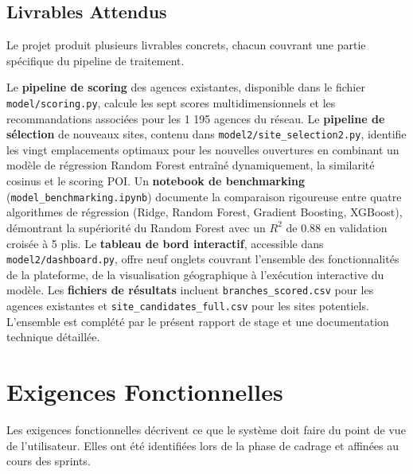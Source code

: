 \documentclass[11pt,a4paper,twoside]{report}
\begin{document}
\subsection{Livrables Attendus}

Le projet produit plusieurs livrables concrets, chacun couvrant une partie spécifique du pipeline de traitement.

Le \textbf{pipeline de scoring} des agences existantes, disponible dans le fichier \texttt{model/scoring.py}, calcule les sept scores multidimensionnels et les recommandations associées pour les 1 195 agences du réseau. Le \textbf{pipeline de sélection} de nouveaux sites, contenu dans \texttt{model2/site\_selection2.py}, identifie les vingt emplacements optimaux pour les nouvelles ouvertures en combinant un modèle de régression Random Forest entraîné dynamiquement, la similarité cosinus et le scoring POI. Un \textbf{notebook de benchmarking} (\texttt{model\_benchmarking.ipynb}) documente la comparaison rigoureuse entre quatre algorithmes de régression (Ridge, Random Forest, Gradient Boosting, XGBoost), démontrant la supériorité du Random Forest avec un $R^2$ de 0.88 en validation croisée à 5 plis. Le \textbf{tableau de bord interactif}, accessible dans \texttt{model2/dashboard.py}, offre neuf onglets couvrant l'ensemble des fonctionnalités de la plateforme, de la visualisation géographique à l'exécution interactive du modèle. Les \textbf{fichiers de résultats} incluent \texttt{branches\_scored.csv} pour les agences existantes et \texttt{site\_candidates\_full.csv} pour les sites potentiels. L'ensemble est complété par le présent rapport de stage et une documentation technique détaillée.

\section{Exigences Fonctionnelles}

Les exigences fonctionnelles décrivent ce que le système doit faire du point de vue de l'utilisateur. Elles ont été identifiées lors de la phase de cadrage et affinées au cours des sprints.
\end{document}
